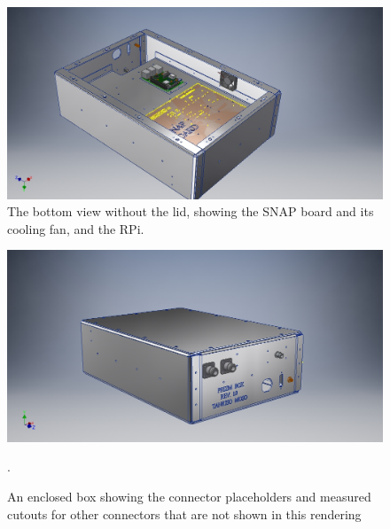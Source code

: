 \begin{figure}	
	\centering
	\includegraphics[width=\linewidth]{"Figures/Bottom Open"}
	\caption{The bottom view without the lid, showing the SNAP board and its cooling fan, and the RPi.} 
	\label{Fig:Bottom Open}
\end{figure}	
	
\begin{figure}
	\centering
	\includegraphics[width=\linewidth]{Figures/Enclosed}
	\caption{An enclosed box showing the connector placeholders and measured cutouts for other connectors that are not shown in this rendering}.	\label{Fig:Enclosed}
\end{figure}
